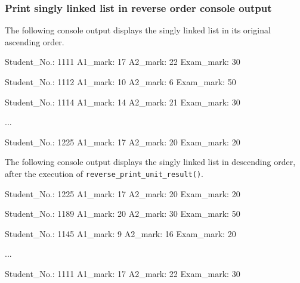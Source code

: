 \newpage
\subsubsection{Print singly linked list in reverse order console output}

The following console output displays the singly linked list in its original ascending order.
\\
\begin{consolecode}
Student_No.: 1111
A1_mark: 17
A2_mark: 22
Exam_mark: 30

Student_No.: 1112
A1_mark: 10
A2_mark: 6
Exam_mark: 50

Student_No.: 1114
A1_mark: 14
A2_mark: 21
Exam_mark: 30

...

Student_No.: 1225
A1_mark: 17
A2_mark: 20
Exam_mark: 20
\end{consolecode}

\noindent
The following console output displays the singly linked list in descending order, after the execution of \texttt{reverse_print_unit_result()}.
\\
\begin{consolecode}
Student_No.: 1225
A1_mark: 17
A2_mark: 20
Exam_mark: 20

Student_No.: 1189
A1_mark: 20
A2_mark: 30
Exam_mark: 50

Student_No.: 1145
A1_mark: 9
A2_mark: 16
Exam_mark: 20

...

Student_No.: 1111
A1_mark: 17
A2_mark: 22
Exam_mark: 30
\end{consolecode}
